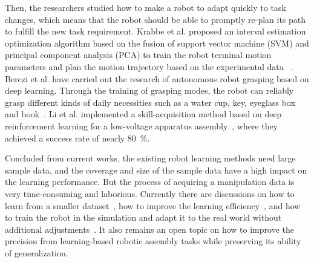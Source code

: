 \documentclass[journal,twoside,web]{ieeecolor}
\begin{document}
Then, the researchers studied how to make a robot to adapt quickly to task changes, which means that the robot should be able to promptly re-plan its path to fulfill the new task requirement. 
Krabbe et al. proposed an interval estimation optimization algorithm based on the fusion of support vector machine (SVM) and principal component analysis (PCA) to train the robot terminal motion parameters and plan the motion trajectory based on the experimental data ~\cite{Krabbe2014Autonomous}. 
Berczi et al. have carried out the research of autonomous robot grasping based on deep learning. Through the training of grasping modes, the robot can reliably grasp different kinds of daily necessities such as a water cup, key, eyeglass box and book~\cite{Berczi2015Learning}. 
Li et al. implemented a skill-acquisition method based on deep reinforcement learning for a low-voltage apparatus assembly~\cite{Li2019}, where they achieved a success rate of nearly \SI{80}{\percent}.

Concluded from current works, the existing robot learning methods need large sample data, and the coverage and size of the sample data have a high impact on the learning performance. But the process of acquiring a manipulation data is very time-consuming and laborious.
Currently there are discussions on how to learn from a smaller dataset~\cite{Xu2018a,NIPS2017_6709}, how to improve the learning efficiency~\cite{Levine2017}, and how to train the robot in the simulation and adapt it to the real world without additional adjustments~\cite{Chebotar2018}. It also remains an open topic on how to improve the precision from learning-based robotic assembly tasks while preserving its ability of generalization.
\end{document}
